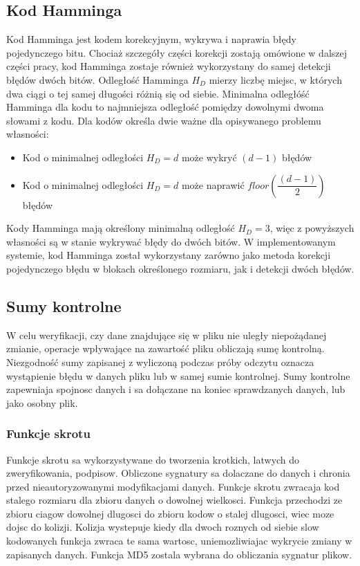 \subsection{Kod Hamminga}
Kod Hamminga jest kodem korekcyjnym, wykrywa i naprawia błędy pojedynczego bitu. Chociaż szczegóły części korekcji zostają omówione w dalszej części pracy, kod Hamminga zostaje również wykorzystany do samej detekcji błędów dwóch bitów.
Odległość Hamminga $H_D$ mierzy liczbę miejsc, w których dwa ciągi o tej samej długości różnią się od siebie. Minimalna odległóść Hamminga dla kodu to najmniejsza odległość pomiędzy dowolnymi dwoma słowami z kodu. Dla kodów określa dwie ważne dla opisywanego problemu własności:
\begin{itemize}
        \item Kod  o minimalnej odległości $H_D = d$ może wykryć $(d-1)$ błędów
        \item Kod o minimalnej odległości $H_D = d$ może naprawić $floor\left(\dfrac{(d-1)}{2}\right)$ błędów
\end{itemize}
Kody Hamminga mają określony minimalną odległość $H_D = 3$, więc z powyższych własności są w stanie wykrywać błędy do dwóch bitów.  W implementowanym systemie, kod Hamminga został wykorzystany zarówno jako metoda korekcji pojedynczego błędu w blokach określonego rozmiaru, jak i detekcji dwóch błędów.


\subsection{Sumy kontrolne}
    W celu weryfikacji, czy dane znajdujące się w pliku nie uległy niepożądanej zmianie, operacje wpływające na zawartość pliku obliczają sumę kontrolną. Niezgodność sumy zapisanej z wyliczoną podczas próby odczytu oznacza wystąpienie błędu w danych pliku lub w samej sumie kontrolnej. Sumy kontrolne zapewniaja spojnosc danych i sa dołączane na koniec sprawdzanych danych, lub jako osobny plik. 
\subsubsection{Funkcje skrotu}
Funkcje skrotu sa wykorzystywane do tworzenia krotkich, latwych do zweryfikowania, podpisow. Obliczone sygnatury sa dolaczane do danych i chronia przed nieautoryzowanymi modyfikacjami danych. Funkcje skrotu zwracaja kod stalego rozmiaru dla zbioru danych o dowolnej wielkosci. Funkcja przechodzi ze zbioru ciagow dowolnej dlugosci do zbioru kodow o stalej dlugosci, wiec moze dojsc do kolizji. Kolizja wystepuje kiedy dla dwoch roznych od siebie slow kodowanych funkcja zwraca te sama wartosc, uniemozliwiajac wykrycie zmiany w zapisanych danych. Funkcja MD5 zostala wybrana do obliczania sygnatur plikow.
